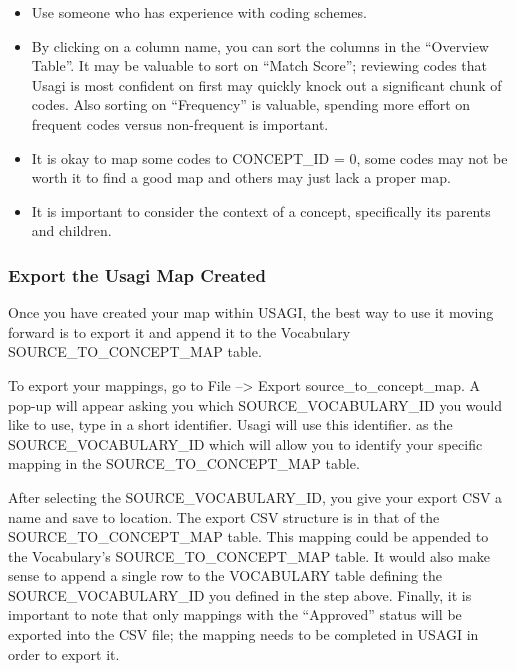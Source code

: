 \documentclass[11pt]{book}
\providecommand{\tightlist}{%
  \setlength{\itemsep}{0pt}\setlength{\parskip}{0pt}}
\theoremstyle{definition}
\theoremstyle{definition}
\theoremstyle{definition}
\theoremstyle{remark}
\begin{document}
\begin{itemize}
\tightlist
\item
  Use someone who has experience with coding schemes.
\item
  By clicking on a column name, you can sort the columns in the ``Overview Table''. It may be valuable to sort on ``Match Score''; reviewing codes that Usagi is most confident on first may quickly knock out a significant chunk of codes. Also sorting on ``Frequency'' is valuable, spending more effort on frequent codes versus non-frequent is important.
\item
  It is okay to map some codes to CONCEPT\_ID = 0, some codes may not be worth it to find a good map and others may just lack a proper map.
\item
  It is important to consider the context of a concept, specifically its parents and children.
\end{itemize}

\hypertarget{export-the-usagi-map-created}{%
\subsubsection*{Export the Usagi Map Created}\label{export-the-usagi-map-created}}

Once you have created your map within USAGI, the best way to use it moving forward is to export it and append it to the Vocabulary SOURCE\_TO\_CONCEPT\_MAP table.

To export your mappings, go to File --\textgreater{} Export source\_to\_concept\_map. A pop-up will appear asking you which SOURCE\_VOCABULARY\_ID you would like to use, type in a short identifier. Usagi will use this identifier. as the SOURCE\_VOCABULARY\_ID which will allow you to identify your specific mapping in the SOURCE\_TO\_CONCEPT\_MAP table.

After selecting the SOURCE\_VOCABULARY\_ID, you give your export CSV a name and save to location. The export CSV structure is in that of the SOURCE\_TO\_CONCEPT\_MAP table. This mapping could be appended to the Vocabulary's SOURCE\_TO\_CONCEPT\_MAP table. It would also make sense to append a single row to the VOCABULARY table defining the SOURCE\_VOCABULARY\_ID you defined in the step above. Finally, it is important to note that only mappings with the ``Approved'' status will be exported into the CSV file; the mapping needs to be completed in USAGI in order to export it.
\end{document}
